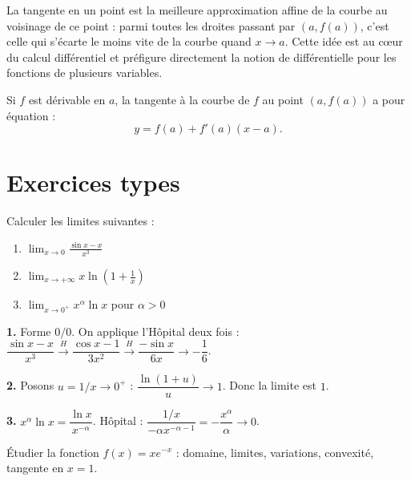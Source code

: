 \documentclass[11pt,a4paper,twoside]{book}
\begin{document}
La tangente en un point est la meilleure approximation affine de la courbe au voisinage de ce point : parmi toutes les droites passant par $(a, f(a))$, c'est celle qui s'écarte le moins vite de la courbe quand $x \to a$. Cette idée est au cœur du calcul différentiel et préfigure directement la notion de différentielle pour les fonctions de plusieurs variables.

\begin{definitionbox}
Si $f$ est dérivable en $a$, la tangente à la courbe de $f$ au point $(a, f(a))$ a pour équation :
\[
  y = f(a) + f'(a)(x-a).
\]
\end{definitionbox}

\section{Exercices types}

\begin{exercicebox}
Calculer les limites suivantes :
\begin{enumerate}
  \item $\displaystyle\lim_{x\to 0}\frac{\sin x - x}{x^3}$
  \item $\displaystyle\lim_{x\to +\infty} x\ln\!\left(1+\frac{1}{x}\right)$
  \item $\displaystyle\lim_{x\to 0^+} x^\alpha \ln x$ pour $\alpha > 0$
\end{enumerate}
\end{exercicebox}

\begin{correctionbox}[Correction]
\textbf{1.} Forme $0/0$. On applique l'Hôpital deux fois :
$\dfrac{\sin x - x}{x^3} \xrightarrow{H} \dfrac{\cos x - 1}{3x^2} \xrightarrow{H} \dfrac{-\sin x}{6x} \to -\dfrac{1}{6}$.

\textbf{2.} Posons $u = 1/x \to 0^+$ : $\dfrac{\ln(1+u)}{u} \to 1$. Donc la limite est $1$.

\textbf{3.} $x^\alpha \ln x = \dfrac{\ln x}{x^{-\alpha}}$. Hôpital : $\dfrac{1/x}{-\alpha x^{-\alpha-1}} = -\dfrac{x^\alpha}{\alpha} \to 0$.
\end{correctionbox}

\begin{exercicebox}
Étudier la fonction $f(x) = x e^{-x}$ : domaine, limites, variations, convexité, tangente en $x=1$.
\end{exercicebox}
\end{document}
